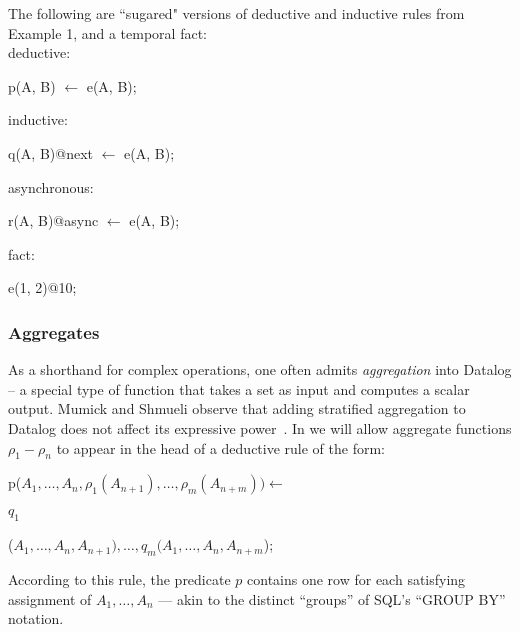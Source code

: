 \begin{example}
The following are ``sugared" versions of deductive and inductive rules from Example 1, and a temporal fact:
\\
deductive:
\begin{Dedalus}
p(A, B) \(\leftarrow\) e(A, B);
\end{Dedalus}
inductive:
\begin{Dedalus}
q(A, B)@next \(\leftarrow\) e(A, B);
\end{Dedalus}
asynchronous:
\begin{Dedalus}
r(A, B)@async \(\leftarrow\) e(A, B);
\end{Dedalus}
fact:
\begin{Dedalus}
e(1, 2)@10;
\end{Dedalus}

\end{example}

\subsubsection{Aggregates}
As a shorthand for complex operations, one often admits {\em aggregation} into Datalog -- a special type of function that takes a set as input and computes a scalar output.  Mumick and Shmueli observe that adding stratified aggregation to Datalog does not affect its expressive power~\cite{mumickshmueli}.  In \lang we will allow aggregate functions $\rho_1 - \rho_n$ to appear in the head of a deductive rule of the form:

\begin{dedalus}
p($A_1, \ldots, A_n, \rho_1(A_{n+1}), \ldots, \rho_m(A_{n+m})) \leftarrow$
\end{dedalus}

\hspace{5mm}
$q_1$
\begin{dedalus}
($A_1, \ldots, A_{n}, A_{n+1}), \ldots, q_m(A_1, \ldots, A_{n}, A_{n+m}$);
\end{dedalus}

According to this rule, the predicate $p$ contains one row for each satisfying assignment of $A_1, \ldots, A_n$ --- akin to the distinct ``groups'' of SQL's ``GROUP BY'' notation.

